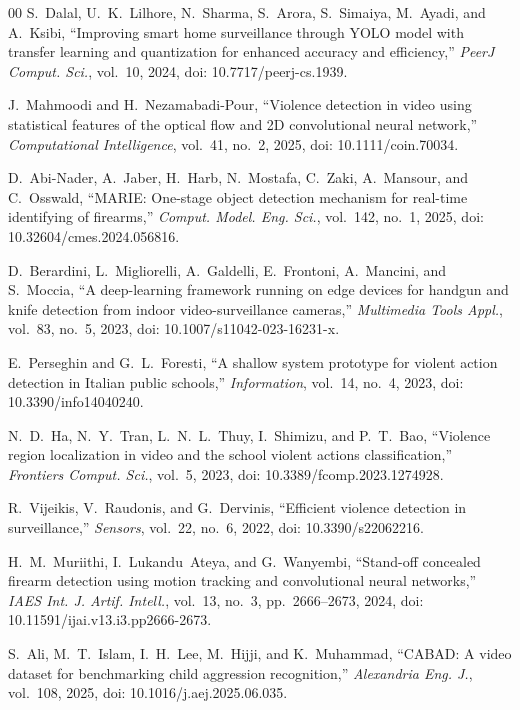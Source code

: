 \documentclass[conference]{IEEEtran}
\begin{document}
\begin{thebibliography}{00}
 S.~Dalal, U.~K.~Lilhore, N.~Sharma, S.~Arora, S.~Simaiya, M.~Ayadi, and A.~Ksibi, ``Improving smart home surveillance through YOLO model with transfer learning and quantization for enhanced accuracy and efficiency,'' \textit{PeerJ Comput. Sci.}, vol.~10, 2024, doi: 10.7717/peerj-cs.1939.

 J.~Mahmoodi and H.~Nezamabadi-Pour, ``Violence detection in video using statistical features of the optical flow and 2D convolutional neural network,'' \textit{Computational Intelligence}, vol.~41, no.~2, 2025, doi: 10.1111/coin.70034.

 D.~Abi-Nader, A.~Jaber, H.~Harb, N.~Mostafa, C.~Zaki, A.~Mansour, and C.~Osswald, ``MARIE: One-stage object detection mechanism for real-time identifying of firearms,'' \textit{Comput. Model. Eng. Sci.}, vol.~142, no.~1, 2025, doi: 10.32604/cmes.2024.056816.

 D.~Berardini, L.~Migliorelli, A.~Galdelli, E.~Frontoni, A.~Mancini, and S.~Moccia, ``A deep-learning framework running on edge devices for handgun and knife detection from indoor video-surveillance cameras,'' \textit{Multimedia Tools Appl.}, vol.~83, no.~5, 2023, doi: 10.1007/s11042-023-16231-x.

 E.~Perseghin and G.~L.~Foresti, ``A shallow system prototype for violent action detection in Italian public schools,'' \textit{Information}, vol.~14, no.~4, 2023, doi: 10.3390/info14040240.

 N.~D.~Ha, N.~Y.~Tran, L.~N.~L.~Thuy, I.~Shimizu, and P.~T.~Bao, ``Violence region localization in video and the school violent actions classification,'' \textit{Frontiers Comput. Sci.}, vol.~5, 2023, doi: 10.3389/fcomp.2023.1274928.

 R.~Vijeikis, V.~Raudonis, and G.~Dervinis, ``Efficient violence detection in surveillance,'' \textit{Sensors}, vol.~22, no.~6, 2022, doi: 10.3390/s22062216.

 H.~M.~Muriithi, I.~Lukandu~Ateya, and G.~Wanyembi, ``Stand-off concealed firearm detection using motion tracking and convolutional neural networks,'' \textit{IAES Int. J. Artif. Intell.}, vol.~13, no.~3, pp.~2666--2673, 2024, doi: 10.11591/ijai.v13.i3.pp2666-2673.

 S.~Ali, M.~T.~Islam, I.~H.~Lee, M.~Hijji, and K.~Muhammad, ``CABAD: A video dataset for benchmarking child aggression recognition,'' \textit{Alexandria Eng. J.}, vol.~108, 2025, doi: 10.1016/j.aej.2025.06.035.


\end{thebibliography}
\end{document}
